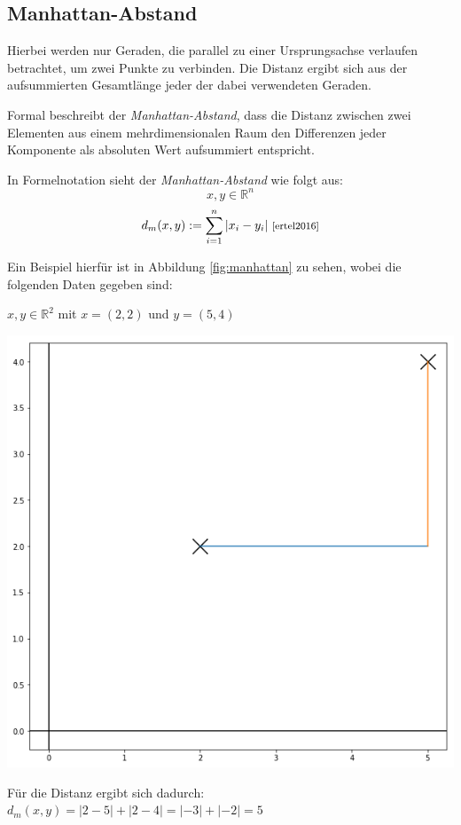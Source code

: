 \documentclass[fontsize=11pt]{scrartcl}
\newenvironment{Figure}
  {\par\medskip\noindent\minipage{\linewidth}}
  {\endminipage\par\medskip}
\begin{document}
            
            \subsection{Manhattan-Abstand}
                Hierbei werden nur Geraden, die parallel zu einer Ursprungsachse verlaufen betrachtet, um zwei Punkte zu verbinden. Die Distanz ergibt sich aus der aufsummierten Gesamtlänge jeder der dabei verwendeten Geraden.\par 
                Formal beschreibt der \emph{Manhattan-Abstand}, dass die Distanz zwischen zwei Elementen aus einem mehrdimensionalen Raum den Differenzen jeder Komponente als absoluten Wert aufsummiert entspricht.\par %

				
                In Formelnotation sieht der \emph{Manhattan-Abstand} wie folgt aus:
                $$
                    x,y \in \mathbb{R}^n 
                $$
                $$
                    d_m(x,y):= \sum_{i=1}^{n} |x_i -y_i| \text{ \footnotesize\cite[S.245]{ertel2016}}
                $$

                Ein Beispiel hierfür ist in Abbildung \ref{fig:manhattan} zu sehen, wobei die folgenden Daten gegeben sind:\par
                   $x,y \in \mathbb{R}^2$ mit $x= (2, 2)$ und $y= (5,4)$
                \begin{Figure}
                    \centering
                    \includegraphics[scale=0.3]{manhattanDistance.png}
                   \label{fig:manhattan}
                \end{Figure}    
              	Für die Distanz ergibt sich dadurch: $d_m(x,y)= |2-5|+|2-4|=|-3|+|-2|=5$                  
\end{document}

